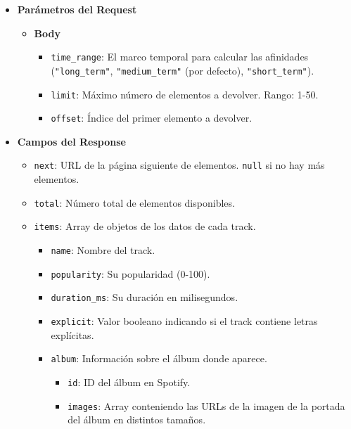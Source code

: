 \begin{itemize}
    \item \textbf{Parámetros del Request}
          \begin{itemize}
              \item \textbf{Body}
                    \begin{itemize}
                        \item \texttt{time\_range}: El marco temporal para calcular las afinidades (\texttt{"long\_term"}, \texttt{"medium\_term"} (por defecto), \texttt{"short\_term"}).
                        \item \texttt{limit}: Máximo número de elementos a devolver. Rango: 1-50.
                        \item \texttt{offset}: Índice del primer elemento a devolver.
                    \end{itemize}
          \end{itemize}
    \item \textbf{Campos del Response}
          \begin{itemize}
              \item \texttt{next}: URL de la página siguiente de elementos. \texttt{null} si no hay más elementos.
              \item \texttt{total}: Número total de elementos disponibles.
              \item \texttt{items}: Array de objetos de los datos de cada track.
                    \begin{itemize}
                        \item \texttt{name}: Nombre del track.
                        \item \texttt{popularity}: Su popularidad (0-100).
                        \item \texttt{duration\_ms}: Su duración en milisegundos.
                        \item \texttt{explicit}: Valor booleano indicando si el track contiene letras explícitas.
                        \item \texttt{album}: Información sobre el álbum donde aparece.
                              \begin{itemize}
                                  \item \texttt{id}: ID del álbum en Spotify.
                                  \item \texttt{images}: Array conteniendo las URLs de la imagen de la portada del álbum en distintos tamaños.

\end{itemize}
\end{itemize}
\end{itemize}
\end{itemize}
